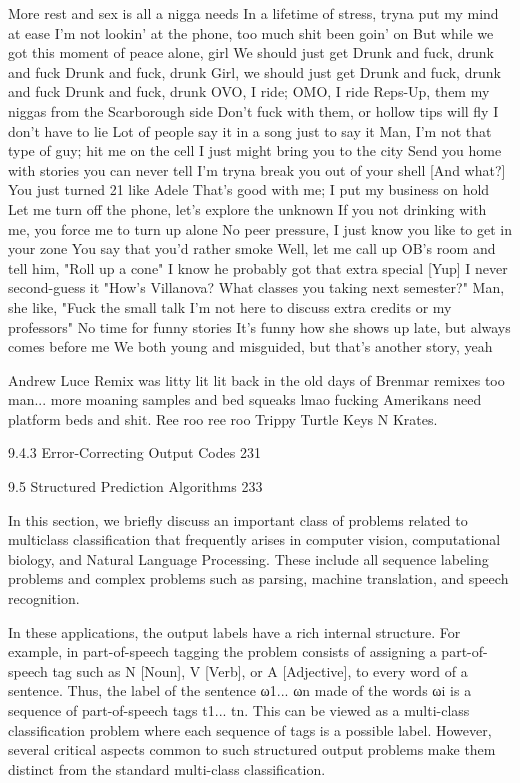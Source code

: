 More rest and sex is all a nigga needs
In a lifetime of stress, tryna put my mind at ease
I'm not lookin' at the phone, too much shit been goin' on
But while we got this moment of peace alone, girl
We should just get
Drunk and fuck, drunk and fuck
Drunk and fuck, drunk
Girl, we should just get
Drunk and fuck, drunk and fuck
Drunk and fuck, drunk
OVO, I ride; OMO, I ride
Reps-Up, them my niggas from the Scarborough side
Don't fuck with them, or hollow tips will fly
I don't have to lie
Lot of people say it in a song just to say it
Man, I'm not that type of guy; hit me on the cell
I just might bring you to the city
Send you home with stories you can never tell
I'm tryna break you out of your shell
[And what?] You just turned 21 like Adele
That's good with me; I put my business on hold
Let me turn off the phone, let's explore the unknown
If you not drinking with me, you force me to turn up alone
No peer pressure, I just know you like to get in your zone
You say that you'd rather smoke
Well, let me call up OB's room and tell him, "Roll up a cone"
I know he probably got that extra special [Yup]
I never second-guess it
"How's Villanova? What classes you taking next semester?"
Man, she like, "Fuck the small talk
I'm not here to discuss extra credits or my professors"
No time for funny stories
It's funny how she shows up late, but always comes before me
We both young and misguided, but that's another story, yeah

Andrew Luce Remix was litty lit lit back in the old days of Brenmar remixes too man... more moaning samples and bed squeaks lmao fucking Amerikans need platform beds and shit. Ree roo ree roo Trippy Turtle Keys N Krates.

9.4.3 Error-Correcting Output Codes 231



9.5 Structured Prediction Algorithms 233

In this section, we briefly discuss an important class of problems related to multiclass classification that frequently arises in computer vision, computational biology, and Natural Language Processing. These include all sequence labeling problems and complex problems such as parsing, machine translation, and speech recognition.

In these applications, the output labels have a rich internal structure. For example, in part-of-speech tagging the problem consists of assigning a part-of-speech tag such as N [Noun], V [Verb], or A [Adjective], to every word of a sentence. Thus, the label of the sentence ω1... ωn made of the words ωi is a sequence of part-of-speech tags t1... tn. This can be viewed as a multi-class classification problem where each sequence of tags is a possible label. However, several critical aspects common to such structured output problems make them distinct from the standard multi-class classification.

